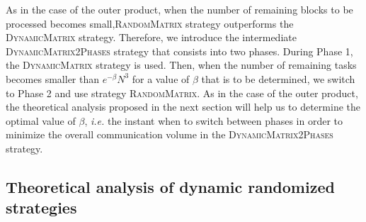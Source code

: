 \documentclass[a4paper,10pt]{article}
\newcommand{\ie}{{\it i.e.}\xspace}
\newcommand{\simplerandommat}{\textsc{Random\-Matrix}\xspace}
\newcommand{\stupidmat}{\textsc{Dynamic\-Matrix}\xspace}
\newcommand{\stupidthresholdmat}{\textsc{Dynamic\-Matrix\-2Phases}\xspace}
\begin{document}
\begin{algorithm}[htbp]
  \DontPrintSemicolon
  \caption{\stupidmat strategy.}
  \label{algo.stupidmat}
\end{algorithm}


As in the case of the outer product, when the number of remaining
blocks to be processed becomes small,\simplerandommat strategy
outperforms the \stupidmat strategy. Therefore, we introduce the
intermediate \stupidthresholdmat strategy that consists into two
phases. During Phase 1, the \stupidmat strategy is used. Then, when
the number of remaining tasks becomes smaller than $e^{-\beta} N^3$
for a value of $\beta$ that is to be determined, we switch to Phase 2
and use strategy \simplerandommat. As in the case of the outer
product, the theoretical analysis proposed in the next section will
help us to determine the optimal value of $\beta$, \ie the instant
when to switch between phases in order to minimize the overall
communication volume in the \stupidthresholdmat strategy.


\subsection{Theoretical analysis of dynamic randomized strategies}
\end{document}
